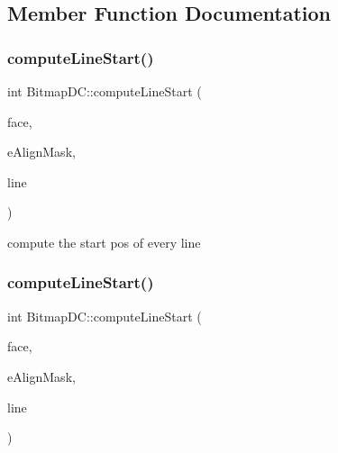 \subsection{Member Function Documentation}
\mbox{\label{classBitmapDC_a328c33eb275ee20b6730ffccbaf989cd}} 
\subsubsection{\texorpdfstring{compute\+Line\+Start()}{computeLineStart()}\hspace{0.1cm}{\footnotesize\ttfamily [1/2]}}
{\footnotesize\ttfamily int Bitmap\+D\+C\+::compute\+Line\+Start (\begin{DoxyParamCaption}\item[{\hyperlink{structFT__FaceRec__}{F\+T\+\_\+\+Face}}]{face,  }\item[{\hyperlink{classDevice_a62f8577d4803c8fce764f7cdff2abe92}{Device\+::\+Text\+Align}}]{e\+Align\+Mask,  }\item[{int}]{line }\end{DoxyParamCaption})\hspace{0.3cm}{\ttfamily [inline]}}

compute the start pos of every line \mbox{\label{classBitmapDC_a328c33eb275ee20b6730ffccbaf989cd}} 
\subsubsection{\texorpdfstring{compute\+Line\+Start()}{computeLineStart()}\hspace{0.1cm}{\footnotesize\ttfamily [2/2]}}
{\footnotesize\ttfamily int Bitmap\+D\+C\+::compute\+Line\+Start (\begin{DoxyParamCaption}\item[{\hyperlink{structFT__FaceRec__}{F\+T\+\_\+\+Face}}]{face,  }\item[{\hyperlink{classDevice_a62f8577d4803c8fce764f7cdff2abe92}{Device\+::\+Text\+Align}}]{e\+Align\+Mask,  }\item[{int}]{line }\end{DoxyParamCaption})\hspace{0.3cm}{\ttfamily [inline]}}

